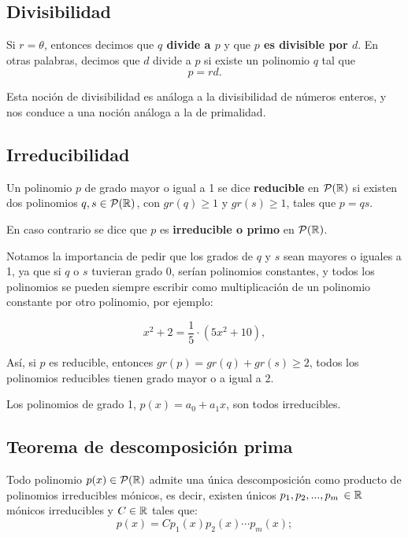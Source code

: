 \subsection{Divisibilidad}

\begin{defn}
Si $r=\theta$, entonces decimos que {\bf $q$ divide a $p$} y que {\bf $p$ es divisible por $d$}.
En otras palabras, decimos que $d$ divide a $p$ si existe un polinomio $q$ tal que 
$$p=rd.$$
\end{defn}

Esta noción de divisibilidad es análoga a la divisibilidad de números enteros, y nos conduce a una noción análoga a la de primalidad.

\subsection{Irreducibilidad}

\begin{defn}
Un polinomio $p$ de grado mayor o igual a 1 se dice  {\bf reducible} en $\mathcal{P}(\mathbb{R})$ si existen dos polinomios $q, s\in \mathcal{P}(\mathbb{R})$, con $gr(q)\ge 1$ y $ gr(s)\ge 1$, tales  que $p=q s$.

En caso contrario se dice que $p$ es {  {\bf irreducible o primo}} en $\mathcal{P}(\mathbb{R})$.
\end{defn}


Notamos la importancia de pedir que los grados de $q$ y $s$ sean mayores o iguales a 1, ya que si $q$ o $s$ tuvieran grado 0, serían polinomios constantes, y todos los polinomios se pueden siempre escribir como multiplicación de un polinomio constante por otro polinomio, por ejemplo:

$$ x^2+2=\frac{1}{5}\cdot (5x^2+10),$$

Así, si $p$ es reducible, entonces $gr(p)=gr(q)+gr(s)\ge 2$, todos los polinomios reducibles tienen grado mayor o a igual a 2.

\medskip

\begin{rem}
 Los polinomios de grado 1, $p(x)=a_0+a_1x$,  son todos irreducibles.
\end{rem}

\subsection{Teorema de descomposición prima}

\begin{thm}
Todo polinomio  $\displaystyle p(x) \in \mathcal{P}(\mathbb{R})$ admite una única descomposici\'on como producto de polinomios irreducibles mónicos, es decir, existen únicos $p_1, p_2,...,p_m\,\in\mathbb{R}$ mónicos irreducibles y $C\in \mathbb{R}$ tales que:
\[
p(x)=Cp_1(x)p_2(x)\cdots p_m(x);
\]
\end{thm}

